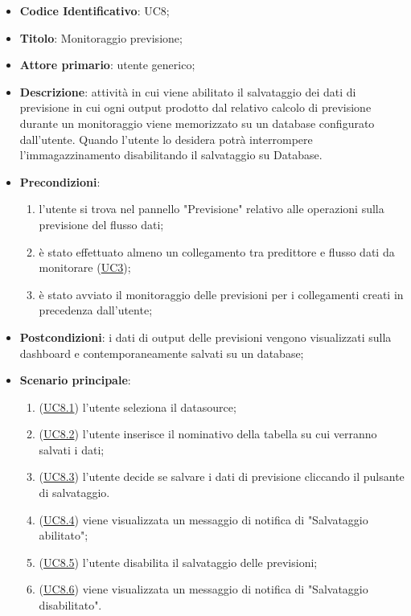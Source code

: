 		\begin{itemize}
			\item\textbf{Codice Identificativo}: UC8;
			\item\textbf{Titolo}: Monitoraggio previsione;
			\item\textbf{Attore primario}: utente generico;
			\item\textbf{Descrizione}: attività in cui viene abilitato il salvataggio dei dati di previsione in cui ogni output prodotto dal relativo calcolo di previsione durante un monitoraggio viene memorizzato su un database configurato dall'utente. Quando l'utente lo desidera potrà interrompere l'immagazzinamento disabilitando il salvataggio su Database.
			\item\textbf{Precondizioni}:
				\begin{enumerate}
					\item l'utente si trova nel pannello "Previsione" relativo alle operazioni sulla previsione del flusso dati;
					\item è stato effettuato almeno un collegamento tra predittore e flusso dati da monitorare (\hyperref[par:UC3]{UC3});
					\item è stato avviato il monitoraggio delle previsioni per i collegamenti creati in precedenza dall'utente;
				\end{enumerate}		
	\item\textbf{Postcondizioni}: i dati di output delle previsioni vengono visualizzati sulla dashboard e contemporaneamente salvati su un database;
			\item\textbf{Scenario principale}:
				\begin{enumerate}
				    \item (\hyperref[par:UC8.1]{UC8.1}) l'utente seleziona il datasource;
				    \item (\hyperref[par:UC8.2]{UC8.2}) l'utente inserisce il nominativo della tabella su cui verranno salvati i dati;
				    
					\item (\hyperref[par:UC8.3]{UC8.3}) l'utente decide se salvare i dati di previsione cliccando il pulsante di salvataggio.	
					\item (\hyperref[par:UC8.4]{UC8.4}) viene visualizzata un messaggio di notifica di "Salvataggio abilitato";
					\item (\hyperref[par:UC8.5]{UC8.5}) l'utente disabilita il salvataggio delle previsioni;
				    \item (\hyperref[par:UC8.6]{UC8.6}) viene visualizzata un messaggio di notifica di "Salvataggio disabilitato".
				\end{enumerate}
		\end{itemize}
		

